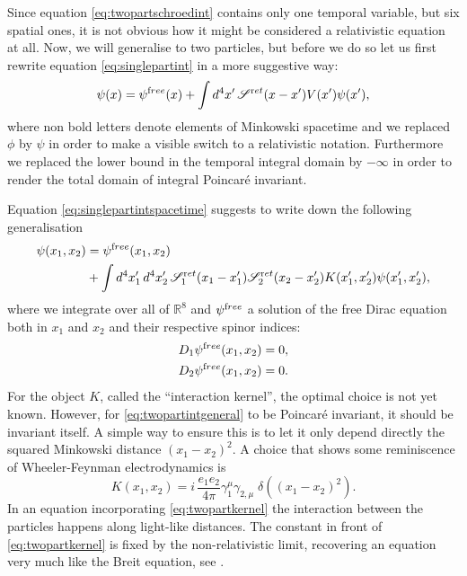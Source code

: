 \documentclass[b5paper,draft,openbib,12pt]{memoir}
\newcommand{\ret}{{\textup ret}}
\newcommand{\free}{{\textup free}}
\begin{document}
Since equation \eqref{eq:twopartschroedint} contains 
only one temporal variable, but six spatial ones,
it is not obvious how it might be considered a 
relativistic equation at all. Now, we will 
generalise to two particles, but before we do so 
let us first rewrite equation 
\eqref{eq:singlepartint} in a more suggestive way:
\begin{equation}
	\psi(x) = \psi^\free(x) + \int d^4 x' \, \mathscr{S}^\ret(x-x') V(x') \psi(x'),
	\label{eq:singlepartintspacetime}
\end{equation}
where non bold letters denote elements of Minkowski 
spacetime and we replaced \(\phi\)
by \(\psi\) in order to make a visible switch to 
a relativistic notation. 
Furthermore we replaced the lower bound in the 
temporal integral domain by \(-\infty\)
in order to render the total domain of integral Poincaré invariant.

Equation \eqref{eq:singlepartintspacetime} 
suggests to write down the
following generalisation
\begin{align}\label{eq:twopartintgeneral}
  \psi(x_1,x_2) &= \psi^\free(x_1,x_2) \\\nonumber
  &+ \int d^4 x_1'\, d^4 x_2' \, \mathscr{S}^\ret_1(x_1-x_1') \mathscr{S}^\ret_2(x_2-x_2') K(x_1',x_2') \psi(x_1',x_2'),
\end{align}
where we integrate over all of \(\mathbb{R}^8\) and \(\psi^\free\) a solution of the free 
Dirac equation both in \(x_1\) and \(x_2\) and their respective spinor indices:
\begin{align}
  D_1  \psi^\free(x_1,x_2) = 0,\\
  D_2  \psi^\free(x_1,x_2) = 0.
	\label{eq:freemultitime}
\end{align}
For the object \(K\), called the ``interaction kernel'', the optimal choice is not yet known.
However, for \eqref{eq:twopartintgeneral} to be Poincaré invariant, it should be invariant
itself. A simple way to ensure this is to let it only depend directly 
the squared Minkowski distance \((x_1-x_2)^2\). A choice that shows some reminiscence of 
Wheeler-Feynman electrodynamics is
\begin{equation}
	K(x_1,x_2) = i\, \frac{e_1e_2}{4\pi} \gamma_1^\mu \gamma_{2,\mu} \; \delta((x_1-x_2)^2).
	\label{eq:twopartkernel}
\end{equation}
In an equation incorporating \eqref{eq:twopartkernel} the interaction between the particles 
happens along light-like distances. The constant in front of \eqref{eq:twopartkernel}
is fixed by the non-relativistic limit, recovering an equation very much like the Breit equation,
see \cite[section 3.6]{direct_interaction_quantum}.
\end{document}

